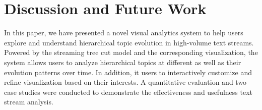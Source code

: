 
\section{Discussion and Future Work}\label{sec:conclustion}
In this paper, we have presented a novel visual analytics system to help users explore and understand hierarchical topic evolution in high-volume text streams.
Powered by the streaming tree cut model and the corresponding visualization, the system allows users to analyze hierarchical topics at different  as well as their evolution patterns over time.
In addition, it  users to interactively customize and refine  visualization based on their interests.
A quantitative evaluation and two case studies were conducted to demonstrate the effectiveness and usefulness   text stream analysis.

